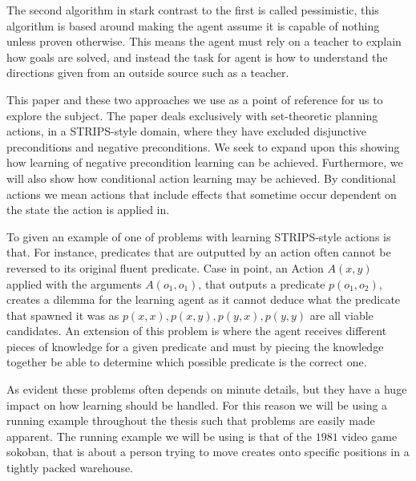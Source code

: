 \documentclass[Master.tex]{subfiles}
\begin{document}
	The second algorithm in stark contrast to the first is called pessimistic, this algorithm is based around making the agent assume it is capable of nothing unless proven otherwise. This means the agent must rely on a teacher to explain how goals are solved, and instead the task for agent is how to understand the directions given from an outside source such as a teacher.
	
	This paper and these two approaches we use as a point of reference for us to explore the subject.  The paper deals exclusively with set-theoretic planning actions, in a STRIPS-style domain, where they have excluded disjunctive preconditions and negative preconditions. 
	We seek to expand upon this showing how learning of negative precondition learning can be achieved. Furthermore, we will also show how conditional action learning may be achieved. By conditional actions we mean actions that include effects that sometime occur dependent on the state the action is applied in.
	
	
	To given an example of one of problems with learning STRIPS-style actions is that. For instance, predicates that are outputted by an action often cannot be reversed to its original fluent predicate. Case in point, an Action $A(x,y)$ applied with the arguments $A(o_1,o_1)$, that outputs a predicate $p(o_1,o_2)$, creates a dilemma for the learning agent as it cannot deduce what the predicate that spawned it was as $p(x,x), p(x,y), p(y,x), p(y,y)$ are all viable candidates. An extension of this problem is where the agent receives different pieces of knowledge for a given predicate and must by piecing the knowledge together be able to determine which possible predicate is the correct one.
	
	As evident these problems often depends on minute details, but they have a huge impact on how learning should be handled. For this reason we will be using a running example throughout the thesis such that problems are easily made apparent. The running example we will be using is that of the $1981$ video game sokoban, that is about a person trying to move creates onto specific positions in a tightly packed warehouse.
	
\end{document}
